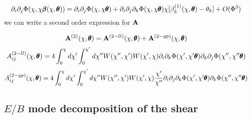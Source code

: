 \begin{equation}
\label{eq:2:tidalapprox}
\partial_i\partial_j\Phi(\chi,\chi\pmb{\beta}(\chi,\pmb{\theta})) = \partial_i\partial_j\Phi(\chi,\chi\pmb{\theta}) + \partial_i\partial_j\partial_k\Phi(\chi,\chi\pmb{\theta})\chi[\beta_k^{(1)}(\chi,\pmb{\theta})-\theta_k] + O(\Phi^3) 
\end{equation}
%
we can write a second order expression for $\mathbf{A}$ 

\begin{equation}
\label{eq:2:jacobian-so}
\mathbf{A}^{(2)}(\chi,\pmb{\theta}) = \mathbf{A}^{(2-ll)}(\chi,\pmb{\theta}) + \mathbf{A}^{(2-gp)}(\chi,\pmb{\theta}) 
\end{equation}
%
\begin{equation}
\label{eq:2:jacobian-so-ll}
A_{ij}^{(2-ll)}(\chi,\pmb{\theta}) = 4\int_0^\chi d\chi'\int_0^{\chi'}d\chi'' W(\chi'',\chi')W(\chi',\chi)\partial_i\partial_k\Phi(\chi',\chi'\pmb{\theta})\partial_k\partial_j\Phi(\chi'',\chi''\pmb{\theta})
\end{equation} 
%
\begin{equation}
\label{eq:2:jacobian-so-gp}
A_{ij}^{(2-gp)}(\chi,\pmb{\theta}) = 4\int_0^\chi d\chi'\int_0^{\chi'}d\chi'' W(\chi'',\chi')W(\chi',\chi)\frac{\chi'}{\chi''}\partial_i\partial_j\partial_k\Phi(\chi',\chi'\pmb{\theta})\partial_k\Phi(\chi'',\chi''\pmb{\theta})
\end{equation} 
%


\subsection{$E/B$ mode decomposition of the shear}   

